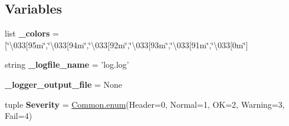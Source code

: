 \subsection*{Variables}
\begin{DoxyCompactItemize}
\item 
\hypertarget{namespaceCardLog_a1e8b3b1f43087dd8f8d63f3f1bde7844}{list {\bfseries \-\_\-colors} = \mbox{[}\char`\"{}\textbackslash{}033\mbox{[}95m\char`\"{},\char`\"{}\textbackslash{}033\mbox{[}94m\char`\"{},\char`\"{}\textbackslash{}033\mbox{[}92m\char`\"{},\char`\"{}\textbackslash{}033\mbox{[}93m\char`\"{},\char`\"{}\textbackslash{}033\mbox{[}91m\char`\"{},\char`\"{}\textbackslash{}033\mbox{[}0m\char`\"{}\mbox{]}}\label{namespaceCardLog_a1e8b3b1f43087dd8f8d63f3f1bde7844}

\item 
\hypertarget{namespaceCardLog_a0707da5eeda4e05fd2cf94fc6a954ccd}{string {\bfseries \-\_\-logfile\-\_\-name} = 'log.\-log'}\label{namespaceCardLog_a0707da5eeda4e05fd2cf94fc6a954ccd}

\item 
\hypertarget{namespaceCardLog_a67b448b1c22fa017ddf4c14c3269159e}{{\bfseries \-\_\-logger\-\_\-output\-\_\-file} = None}\label{namespaceCardLog_a67b448b1c22fa017ddf4c14c3269159e}

\item 
\hypertarget{namespaceCardLog_a8fe5d300d6a2b1b02c664ea2895bfca7}{tuple {\bfseries Severity} = \hyperlink{namespaceCommon_a4392838fb004565ef65e9e93544a80b7}{Common.\-enum}(Header=0, Normal=1, O\-K=2, Warning=3, Fail=4)}\label{namespaceCardLog_a8fe5d300d6a2b1b02c664ea2895bfca7}

\end{DoxyCompactItemize}



